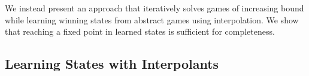 \documentclass{llncs}
\begin{document}
We instead present an approach that iteratively solves games of increasing
bound while learning winning states from abstract games using interpolation. We
show that reaching a fixed point in learned states is sufficient for
completeness.








\subsection{Learning States with Interpolants}
\end{document}
